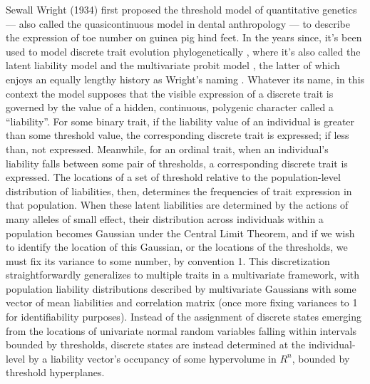 \documentclass[12pt, twocolumn, twoside]{article}
\begin{document}
Sewall Wright (1934) first proposed the threshold model of quantitative genetics --- also called the quasicontinuous model \citep{grunebergGeneticalStudiesSkeleton1955} in dental anthropology --- to describe the expression of toe number on guinea pig hind feet. In the years since, it's been used to model discrete trait evolution phylogenetically \citep{felsensteinUsingQuantitativeGenetic2005a, felsensteinComparativeMethodBoth2012a, revellAncestralCharacterEstimation2014}, where it's also called the latent liability model \citep{cybisAssessingPhenotypicCorrelation2015} and the multivariate probit model \citep{zhangLargescaleInferenceCorrelation2019}, the latter of which enjoys an equally lengthy history as Wright's naming \citep{blissMethodProbits1934, chibAnalysisMultivariateProbit1998}. Whatever its name, in this context the model supposes that the visible expression of a discrete trait is governed by the value of a hidden, continuous, polygenic character called a “liability”. For some binary trait, if the liability value of an individual is greater than some threshold value, the corresponding discrete trait is expressed; if less than, not expressed. Meanwhile, for an ordinal trait, when an individual's liability falls between some pair of thresholds, a corresponding discrete trait is expressed. The locations of a set of threshold relative to the population-level distribution of liabilities, then, determines the frequencies of trait expression in that population. When these latent liabilities are determined by the actions of many alleles of small effect, their distribution across individuals within a population becomes Gaussian under the Central Limit Theorem, and if we wish to identify the location of this Gaussian, or the locations of the thresholds, we must fix its variance to some number, by convention 1. This discretization straightforwardly generalizes to multiple traits in a multivariate framework, with population liability distributions described by multivariate Gaussians with some vector of mean liabilities and correlation matrix (once more fixing variances to 1 for identifiability purposes). Instead of the assignment of discrete states emerging from the locations of univariate normal random variables falling within intervals bounded by thresholds, discrete states are instead determined at the individual-level by a liability vector's occupancy of some hypervolume in $R^n$, bounded by threshold hyperplanes. 
\end{document}
